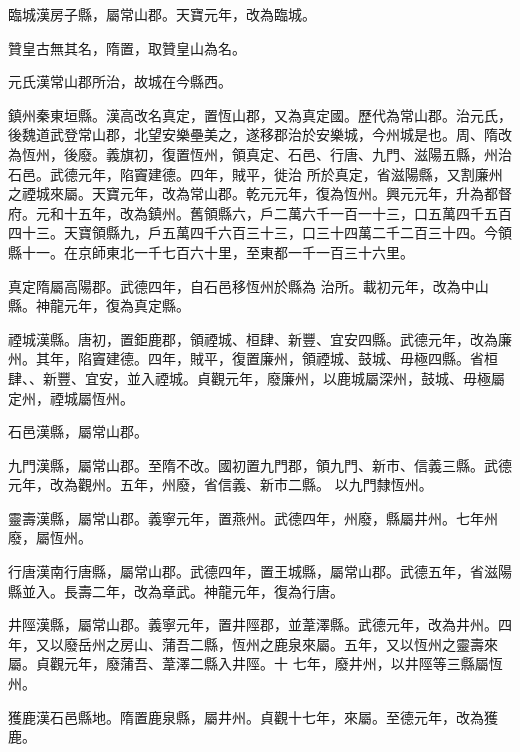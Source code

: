\begin{pinyinscope}
 臨城漢房子縣，屬常山郡。天寶元年，改為臨城。



 贊皇古無其名，隋置，取贊皇山為名。



 元氏漢常山郡所治，故城在今縣西。



 鎮州秦東垣縣。漢高改名真定，置恆山郡，又為真定國。歷代為常山郡。治元氏，後魏道武登常山郡，北望安樂壘美之，遂移郡治於安樂城，今州城是也。周、隋改為恆州，後廢。義旗初，復置恆州，領真定、石邑、行唐、九門、滋陽五縣，州治石邑。武德元年，陷竇建德。四年，賊平，徙治
 所於真定，省滋陽縣，又割廉州之禋城來屬。天寶元年，改為常山郡。乾元元年，復為恆州。興元元年，升為都督府。元和十五年，改為鎮州。舊領縣六，戶二萬六千一百一十三，口五萬四千五百四十三。天寶領縣九，戶五萬四千六百三十三，口三十四萬二千二百三十四。今領縣十一。在京師東北一千七百六十里，至東都一千一百三十六里。



 真定隋屬高陽郡。武德四年，自石邑移恆州於縣為
 治所。載初元年，改為中山縣。神龍元年，復為真定縣。



 禋城漢縣。唐初，置鉅鹿郡，領禋城、桓肆、新豐、宜安四縣。武德元年，改為廉州。其年，陷竇建德。四年，賊平，復置廉州，領禋城、鼓城、毋極四縣。省桓肆、、新豐、宜安，並入禋城。貞觀元年，廢廉州，以鹿城屬深州，鼓城、毋極屬定州，禋城屬恆州。



 石邑漢縣，屬常山郡。



 九門漢縣，屬常山郡。至隋不改。國初置九門郡，領九門、新市、信義三縣。武德元年，改為觀州。五年，州廢，省信義、新市二縣。
 以九門隸恆州。



 靈壽漢縣，屬常山郡。義寧元年，置燕州。武德四年，州廢，縣屬井州。七年州廢，屬恆州。



 行唐漢南行唐縣，屬常山郡。武德四年，置王城縣，屬常山郡。武德五年，省滋陽縣並入。長壽二年，改為章武。神龍元年，復為行唐。



 井陘漢縣，屬常山郡。義寧元年，置井陘郡，並葦澤縣。武德元年，改為井州。四年，又以廢岳州之房山、蒲吾二縣，恆州之鹿泉來屬。五年，又以恆州之靈壽來屬。貞觀元年，廢蒲吾、葦澤二縣入井陘。十
 七年，廢井州，以井陘等三縣屬恆州。



 獲鹿漢石邑縣地。隋置鹿泉縣，屬井州。貞觀十七年，來屬。至德元年，改為獲鹿。




\end{pinyinscope}

